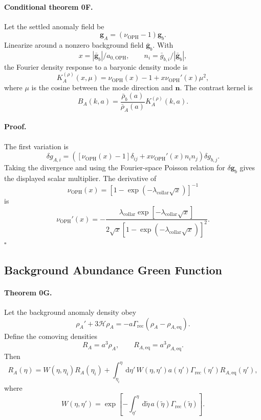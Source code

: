 \documentclass[11pt]{article}
\newcommand{\OPH}{\mathrm{OPH}}
\newcommand{\aoph}{a_{0,\mathrm{OPH}}}
\newcommand{\lambdac}{\lambda_{\mathrm{collar}}}
\newcommand{\dd}{\mathrm{d}}
\begin{document}
\paragraph{Conditional theorem 0F.}
Let the settled anomaly field be
\begin{equation}
  \mathbf g_A=(\nu_{\OPH}-1)\mathbf g_b.
\end{equation}
Linearize around a nonzero background field
\(\bar{\mathbf g}_b\).  With
\[
  x=|\bar{\mathbf g}_b|/\aoph,
  \qquad
  n_i=\bar g_{b,i}/|\bar{\mathbf g}_b|,
\]
the Fourier density response to a baryonic density mode is
\begin{equation}
  K_A^{(\rho)}(x,\mu)
  =
  \nu_{\OPH}(x)-1+x\nu_{\OPH}'(x)\mu^2,
\end{equation}
where \(\mu\) is the cosine between the mode direction and \(\mathbf n\).
The contrast kernel is
\begin{equation}
  B_A(k,a)
  =
  \frac{\bar\rho_b(a)}{\bar\rho_A(a)}K_A^{(\rho)}(k,a).
\end{equation}

\paragraph{Proof.}
The first variation is
\begin{equation}
  \delta g_{A,i}
  =
  \left(
    [\nu_{\OPH}(x)-1]\delta_{ij}
    +x\nu_{\OPH}'(x)n_i n_j
  \right)\delta g_{b,j}.
\end{equation}
Taking the divergence and using the Fourier-space Poisson relation for
\(\delta\mathbf g_b\) gives the displayed scalar multiplier.  The derivative
of
\[
  \nu_{\OPH}(x)=[1-\exp(-\lambdac\sqrt{x})]^{-1}
\]
is
\[
  \nu_{\OPH}'(x)
  =
  -\frac{\lambdac\exp[-\lambdac\sqrt{x}]}
  {2\sqrt{x}[1-\exp(-\lambdac\sqrt{x})]^2}.
\]
\(\square\)

\subsection{Background Abundance Green Function}

\paragraph{Theorem 0G.}
Let the background anomaly density obey
\begin{equation}
  \rho_A' + 3\mathcal H\rho_A
  = -a\Gamma_{\mathrm{rec}}(\rho_A-\rho_{A,\mathrm{eq}}).
\end{equation}
Define the comoving densities
\begin{equation}
  R_A=a^3\rho_A,
  \qquad
  R_{A,\mathrm{eq}}=a^3\rho_{A,\mathrm{eq}}.
\end{equation}
Then
\begin{equation}
  R_A(\eta)=
  W(\eta,\eta_i)R_A(\eta_i)
  +\int_{\eta_i}^{\eta}\dd\eta'\,
    W(\eta,\eta')a(\eta')\Gamma_{\mathrm{rec}}(\eta')
    R_{A,\mathrm{eq}}(\eta'),
\end{equation}
where
\begin{equation}
  W(\eta,\eta')
  =
  \exp\!\left[
    -\int_{\eta'}^{\eta}\dd\tilde\eta\,
      a(\tilde\eta)\Gamma_{\mathrm{rec}}(\tilde\eta)
  \right].
\end{equation}
\end{document}
